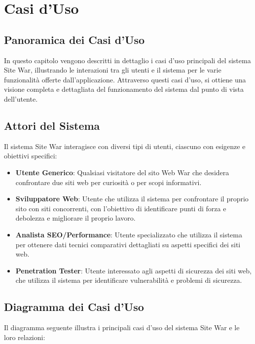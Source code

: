 \chapter{Casi d'Uso}

\section{Panoramica dei Casi d'Uso}
In questo capitolo vengono descritti in dettaglio i casi d'uso principali del sistema Site War, illustrando le interazioni tra gli utenti e il sistema per le varie funzionalità offerte dall'applicazione. Attraverso questi casi d'uso, si ottiene una visione completa e dettagliata del funzionamento del sistema dal punto di vista dell'utente.

\section{Attori del Sistema}
Il sistema Site War interagisce con diversi tipi di utenti, ciascuno con esigenze e obiettivi specifici:

\begin{itemize}
    \item \textbf{Utente Generico}: Qualsiasi visitatore del sito Web War che desidera confrontare due siti web per curiosità o per scopi informativi.
    
    \item \textbf{Sviluppatore Web}: Utente che utilizza il sistema per confrontare il proprio sito con siti concorrenti, con l'obiettivo di identificare punti di forza e debolezza e migliorare il proprio lavoro.
    
    \item \textbf{Analista SEO/Performance}: Utente specializzato che utilizza il sistema per ottenere dati tecnici comparativi dettagliati su aspetti specifici dei siti web.
    
    \item \textbf{Penetration Tester}: Utente interessato agli aspetti di sicurezza dei siti web, che utilizza il sistema per identificare vulnerabilità e problemi di sicurezza.
\end{itemize}

\section{Diagramma dei Casi d'Uso}
Il diagramma seguente illustra i principali casi d'uso del sistema Site War e le loro relazioni:

